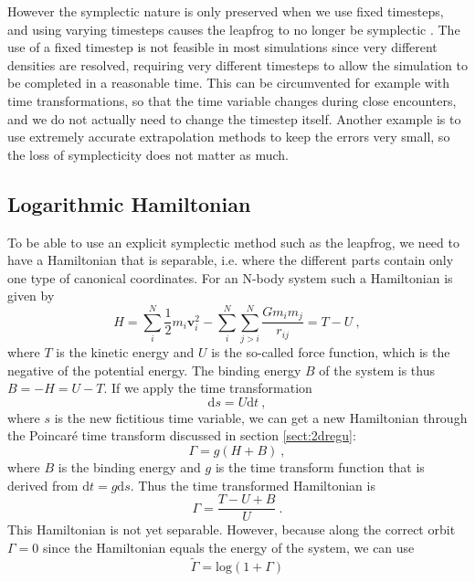 \documentclass[english, oneside]{HYgradu}
\begin{document}
However the symplectic nature is only preserved when we use fixed timesteps, and using varying timesteps causes the leapfrog to no longer be symplectic \citep{bt-galdyn}. The use of a fixed timestep is not feasible in most simulations since very different densities are resolved, requiring very different timesteps to allow the simulation to be completed in a reasonable time. This can be circumvented for example with time transformations, so that the time variable changes during close encounters, and we do not actually need to change the timestep itself. Another example is to use extremely accurate extrapolation methods to keep the errors very small, so the loss of symplecticity does not matter as much.

\subsection{Logarithmic Hamiltonian}
To be able to use an explicit symplectic method such as the leapfrog, we need to have a Hamiltonian that is separable, i.e. where the different parts contain only one type of canonical coordinates.
For an N-body system such a Hamiltonian is given by
\begin{equation}
H = \sum_i^N \frac{1}{2}m_i \boldsymbol{v}_i^2 - \sum_i^N \sum_{j>i}^N \frac{G m_i m_j}{r_{ij}} = T - U \ ,
\end{equation}
where $T$ is the kinetic energy and $U$ is the so-called force function, which is the negative of the potential energy. The binding energy $B$ of the system is thus \mbox{$B = -H = U-T$}. If we apply the time transformation
\begin{equation}
\mathrm{d}s = U \mathrm{d}t \ ,
\end{equation}
where $s$ is the new fictitious time variable, we can get a new Hamiltonian through the Poincaré time transform discussed in section \ref{sect:2dregu}:
\begin{equation}
\Gamma = g (H+B) \ ,
\end{equation}
where $B$ is the binding energy and $g$ is the time transform function that is derived from $\mathrm{d}t = g \mathrm{d}s$. 
Thus the time transformed Hamiltonian is
\begin{equation}
\Gamma = \frac{T-U+B}{U} \ . \label{equ:loghGamma}
\end{equation}
This Hamiltonian is not yet separable. However, because along the correct orbit $\Gamma = 0$ since the Hamiltonian equals the energy of the system, we can use
\begin{equation}
\tilde{\Gamma} = \mathrm{log}(1+\Gamma) \label{equ:loghNewGamma}
\end{equation}
\end{document}
